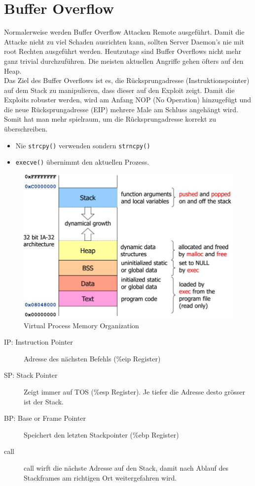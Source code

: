 \section{Buffer Overflow}
Normalerweise werden Buffer Overflow Attacken Remote ausgeführt. Damit die Attacke nicht zu viel Schaden ausrichten kann, sollten Server Daemon's nie mit root Rechten ausgeführt werden. Heutzutage sind Buffer Overflows nicht mehr ganz trivial durchzuführen. Die meisten aktuellen Angriffe gehen öfters auf den Heap. \\


Das Ziel des Buffer Overflows ist es, die Rücksprungadresse (Instruktionspointer) auf dem Stack zu manipulieren, dass dieser auf den Exploit zeigt. Damit die Exploits robuster werden, wird am Anfang NOP (No Operation) hinzugefügt und die neue Rücksprungadresse (EIP) mehrere Male am Schluss angehängt wird. Somit hat man mehr spielraum, um die Rücksprungadresse korrekt zu überschreiben.

\begin{itemize}
	\item Nie \lstinline|strcpy()| verwenden sondern \lstinline|strncpy()|
	\item \lstinline|execve()| übernimmt den aktuellen Prozess.
\end{itemize}

\begin{figure}[h]
\centering
\includegraphics[width=0.7\linewidth]{images/memory_organization}
\caption{Virtual Process Memory Organization}
\label{fig:memoryorganization}
\end{figure}

\begin{description}
	\item[IP: Instruction Pointer] Adresse des nächsten Befehls (\%eip Register)
	\item[SP: Stack Pointer] Zeigt immer auf TOS (\%esp Register). Je tiefer die Adresse desto grösser ist der Stack.
	\item[BP: Base or Frame Pointer] Speichert den letzten Stackpointer (\%ebp Register)
	\item[call] call wirft die nächste Adresse auf den Stack,  damit nach Ablauf des Stackframes am richtigen Ort weitergefahren wird.
\end{description}

